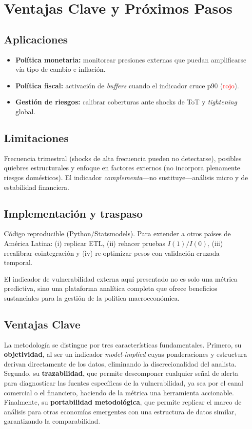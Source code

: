 \documentclass[11pt,a4paper]{article}
\numberwithin{equation}{section}
\begin{document}
\newpage

\section*{Ventajas Clave y Próximos Pasos}

\subsection*{Aplicaciones}
\begin{itemize}\setlength{\itemsep}{2pt}
  \item \textbf{Política monetaria:} monitorear presiones externas que puedan amplificarse vía tipo de cambio e inflación.
  \item \textbf{Política fiscal:} activación de \emph{buffers} cuando el indicador cruce p90 (\textcolor{red}{rojo}).
  \item \textbf{Gestión de riesgos:} calibrar coberturas ante shocks de ToT y \emph{tightening} global.
\end{itemize}

\subsection*{Limitaciones}
Frecuencia trimestral (shocks de alta frecuencia pueden no detectarse), posibles quiebres estructurales y enfoque en factores externos (no incorpora plenamente riesgos domésticos). El indicador \emph{complementa}---no sustituye---análisis micro y de estabilidad financiera.

\subsection*{Implementación y traspaso}
Código reproducible (Python/Statsmodels). Para extender a otros países de América Latina: (i) replicar ETL, (ii) rehacer pruebas $I(1)/I(0)$, (iii) recalibrar cointegración y (iv) re-optimizar pesos con validación cruzada temporal.

El indicador de vulnerabilidad externa aquí presentado no es solo una métrica predictiva, sino una plataforma analítica completa que ofrece beneficios sustanciales para la gestión de la política macroeconómica.

\subsection*{Ventajas Clave}
La metodología se distingue por tres características fundamentales. Primero, su \textbf{objetividad}, al ser un indicador \emph{model-implied} cuyas ponderaciones y estructura derivan directamente de los datos, eliminando la discrecionalidad del analista. Segundo, su \textbf{trazabilidad}, que permite descomponer cualquier señal de alerta para diagnosticar las fuentes específicas de la vulnerabilidad, ya sea por el canal comercial o el financiero, haciendo de la métrica una herramienta accionable. Finalmente, su \textbf{portabilidad metodológica}, que permite replicar el marco de análisis para otras economías emergentes con una estructura de datos similar, garantizando la comparabilidad.
\end{document}
